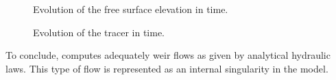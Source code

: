 \begin{figure}[!htbp]
 \centering
 \caption{Evolution of the free surface elevation in time.}
 \label{t2d:weirs:fig:z}
\end{figure}

\begin{figure}[!htbp]
 \centering
 \caption{Evolution of the tracer in time.}
 \label{t2d:weirs:fig:tracer}
\end{figure}

\bigskip
To conclude,  computes adequately weir 
flows as given by analytical hydraulic laws.
This type of flow is represented as an internal 
 singularity in the model.
%